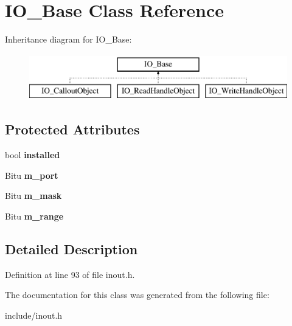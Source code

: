 \hypertarget{classIO__Base}{\section{I\-O\-\_\-\-Base Class Reference}
\label{classIO__Base}
}
Inheritance diagram for I\-O\-\_\-\-Base\-:\begin{figure}[H]
\begin{center}
\leavevmode
\includegraphics[height=2.000000cm]{classIO__Base}
\end{center}
\end{figure}
\subsection*{Protected Attributes}
\begin{DoxyCompactItemize}
\item 
\hypertarget{classIO__Base_a026551908b398abc537a5513b9b29d09}{bool {\bfseries installed}}\label{classIO__Base_a026551908b398abc537a5513b9b29d09}

\item 
\hypertarget{classIO__Base_ad9f634f91ce7bb7f3f171dacd34dd8a1}{Bitu {\bfseries m\-\_\-port}}\label{classIO__Base_ad9f634f91ce7bb7f3f171dacd34dd8a1}

\item 
\hypertarget{classIO__Base_ae1a76b7b795767e67e5508067531b9b6}{Bitu {\bfseries m\-\_\-mask}}\label{classIO__Base_ae1a76b7b795767e67e5508067531b9b6}

\item 
\hypertarget{classIO__Base_a6c0218caa340f7308334379a69b0a7f7}{Bitu {\bfseries m\-\_\-range}}\label{classIO__Base_a6c0218caa340f7308334379a69b0a7f7}

\end{DoxyCompactItemize}


\subsection{Detailed Description}


Definition at line 93 of file inout.\-h.



The documentation for this class was generated from the following file\-:\begin{DoxyCompactItemize}
\item 
include/inout.\-h\end{DoxyCompactItemize}
